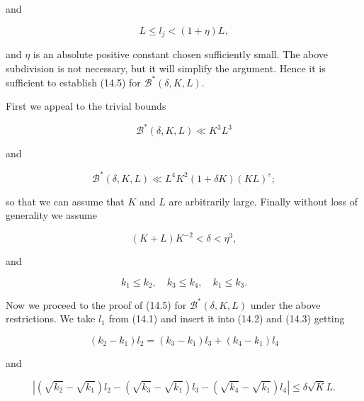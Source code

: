 \documentclass[10pt]{article}
\begin{document}
and


\begin{equation*}
L \leqslant l_{j}<(1+\eta) L, \tag{14.7}
\end{equation*}


and $\eta$ is an absolute positive constant chosen sufficiently small. The above subdivision is not necessary, but it will simplify the argument. Hence it is sufficient to establish (14.5) for $\mathscr{B}^{*}(\delta, K, L)$.

First we appeal to the trivial bounds

$$
\mathscr{B}^{*}(\delta,K,L)\ll K^{3}L^{3}
$$

and

$$
\mathscr{B}^{*}(\delta, K, L) \ll L^{4} K^{2}(1+\delta K)(KL)^{\varepsilon} ;
$$

so that we can assume that $K$ and $L$ are arbitrarily large. Finally without loss of generality we assume


\begin{equation*}
(K+L) K^{-2}<\delta<\eta^{3}, \tag{14.8}
\end{equation*}


and


\begin{equation*}
k_{1} \leqslant k_{2}, \quad k_{3} \leqslant k_{4}, \quad k_{1} \leqslant k_{3} . \tag{14.9}
\end{equation*}


Now we proceed to the proof of (14.5) for $\mathscr{B}^{*}(\delta, K, L)$ under the above restrictions. We take $l_{1}$ from (14.1) and insert it into (14.2) and (14.3) getting


\begin{equation*}
\left(k_{2}-k_{1}\right) l_{2}=\left(k_{3}-k_{1}\right) l_{3}+\left(k_{4}-k_{1}\right) l_{4} \tag{14.10}
\end{equation*}


and


\begin{equation*}
\left|\left(\sqrt{k_{2}}-\sqrt{k_{1}}\right) l_{2}-\left(\sqrt{k_{3}}-\sqrt{k_{1}}\right) l_{3}-\left(\sqrt{k_{4}}-\sqrt{k_{1}}\right) l_{4}\right| \leqslant \delta \sqrt{K} L . \tag{14.11}
\end{equation*}
\end{document}

